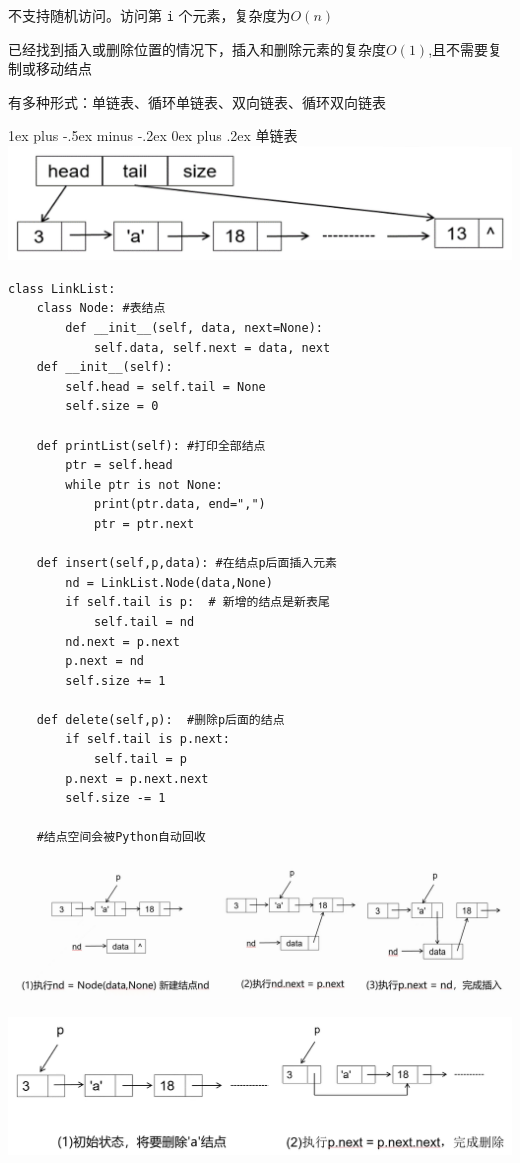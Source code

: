 \documentclass[10pt,UTF8,a4paper]{ctexart}
\makeatletter
\renewcommand{\subsubsection}{\@startsection{subsubsection}{3}{0mm}%
                                {1ex plus -.5ex minus -.2ex}%
                                {0ex plus .2ex}%
                                {\normalfont\small\bfseries}}
\makeatother
\begin{document}
\begin{multicols}{3}
不支持随机访问。访问第 \verb|i| 个元素，复杂度为$O(n)$

已经找到插入或删除位置的情况下，插入和删除元素的复杂度$O(1)$,且不需要复制或移动结点

有多种形式：单链表、循环单链表、双向链表、循环双向链表

\subsubsection{单链表}
\includegraphics[width=\columnwidth]{images/单链表.png}
\begin{lstlisting}[style=python]
class LinkList:
	class Node: #表结点
		def __init__(self, data, next=None):
			self.data, self.next = data, next
	def __init__(self):
		self.head = self.tail = None
		self.size = 0

	def printList(self): #打印全部结点
		ptr = self.head
		while ptr is not None: 
			print(ptr.data, end=",")
			ptr = ptr.next

	def insert(self,p,data): #在结点p后面插入元素
		nd = LinkList.Node(data,None)
		if self.tail is p:  # 新增的结点是新表尾
			self.tail = nd
		nd.next = p.next
		p.next = nd
		self.size += 1
        
	def delete(self,p):  #删除p后面的结点
		if self.tail is p.next:
			self.tail = p
		p.next = p.next.next
		self.size -= 1

	#结点空间会被Python自动回收

\end{lstlisting}

\includegraphics[width=\columnwidth]{images/单链表添加.jpg}

\includegraphics[width=\columnwidth]{images/单链表删除.jpg}


\end{multicols}
\end{document}
